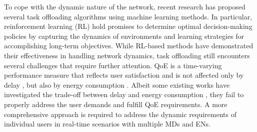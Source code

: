 \documentclass[10pt, journal,letterpaper]{IEEEtran}
\begin{document}






To cope with the dynamic nature of the network, recent research has proposed several task offloading algorithms using machine learning methods. In particular, reinforcement learning (RL) \cite{mnih2015human} hold promises to determine optimal decision-making policies by capturing the dynamics of environments and learning strategies for accomplishing long-term objectives.
While RL-based methods have demonstrated their effectiveness in handling network dynamics, task offloading still encounters several challenges that require further attention. 
QoE is a time-varying performance measure that reflects user satisfaction and is not affected only by delay \cite{guo2022energy}, but also by energy consumption \cite{tang2022uav}. Albeit some existing works have investigated the trade-off between delay and energy consumption \cite{li2022joint}, they fail to properly address the user demands and fulfill QoE requirements. A more comprehensive approach is required to address the dynamic requirements of individual users in real-time scenarios with multiple MDs and ENs. 
\end{document}
